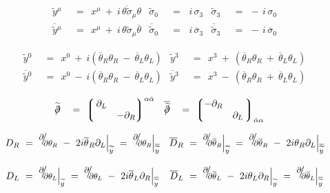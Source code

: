 \documentclass[14pt]{article}
\newcommand{\p}{\partial}
\newcommand{\wt}{\widetilde}
\newcommand{\ov}{\overline}
\newcommand{\lgr}{\left\lgroup}
\newcommand{\rgr}{\right\rgroup}
\def\slashed#1{\setbox0=\hbox{$#1$}             %
   \dimen0=\wd0                                 %
   \setbox1=\hbox{/} \dimen1=\wd1               %
   \ifdim\dimen0>\dimen1                        %
      \rlap{\hbox to \dimen0{\hfil/\hfil}}      %
      #1                                        %
   \else                                        %
      \rlap{\hbox to \dimen1{\hfil$#1$\hfil}}   %
      /                                         %
   \fi}                                         %
\begin{document}
\begin{align*}
	\wt y{}^\mu    & ~~=~~    x^\mu  ~+~  i\,\ov{\theta \wt\sigma}{}_\mu \theta
	&
	\wt \sigma{}_0    & ~~=~~\,    i\, \sigma_3
	&
	\wt \sigma{}_3    & ~~=~\,    -\, i\, \sigma_0
	\\[2mm]
	\ov{\wt y}{}^\mu    & ~~=~~    x^\mu  ~+~  i\,\theta \wt\sigma{}_\mu \ov\theta
	&
	\ov{\wt \sigma}{}_0    & ~~=~~\,    i\, \ov \sigma{}_3
	&
	\ov{\wt \sigma}{}_3    & ~~=~\,    -\, i\, \ov \sigma{}_0
\end{align*}

\begin{align*}
	\wt y{}^0    & ~~=~~  x^0  ~+~ i \left( \ov\theta{}_R\theta_R  ~-~  \ov\theta{}_L\theta_L \right)
	&
	\wt y{}^3    & ~~=~~  x^3  ~+~ \left( \ov\theta{}_R\theta_R  ~+~  \ov\theta{}_L\theta_L \right)
	\\[2mm]
	\ov{\wt y}{}^0    & ~~=~~   x^0  ~-~ i \left( \ov\theta{}_R\theta_R  ~-~  \ov\theta{}_L\theta_L \right)
	&
	\ov{\wt y}{}^3    & ~~=~~   x^3  ~-~ \left( \ov\theta{}_R\theta_R  ~+~  \ov\theta{}_L\theta_L \right)
\end{align*}

\begin{align*}
	\wt{\slashed\p} & ~~~=~ \lgr \begin{matrix}  \, \p_L  &       \\
						              & - \p_R 
				\end{matrix} \rgr^{\alpha\dot\alpha}
	&
	\ov{\slashed{\wt\p}} & ~~~=~ \lgr \begin{matrix}  - \p_R  &       \\
                                                                  & \p_L				
				     \end{matrix} \, \rgr_{\dot\alpha\alpha}
\end{align*}

\begin{align*}
	D_R    & ~=~    \deriv \p {\p \theta_R}  ~-~  2 i \ov\theta{}_R\p_L \Big|_{\wt y}
		 ~=~    \deriv \p {\p \theta_R} \Big|_{\ov{\wt y}}
	&
	\ov D{}_R    & ~=~    \deriv \p {\p \ov\theta{}_R} \Big|_{\wt y}
		       ~=~    \deriv \p {\p \ov\theta{}_R}  ~-~  2 i \theta_R \p_L \Big|_{\ov {\wt y}}
	\\[3mm]
	D_L    & ~=~    \deriv \p {\p \theta_L} \Big|_{\wt y}
		 ~=~    \deriv \p {\p \theta_L} ~-~ 2 i \ov\theta{}_L \p_R \Big|_{\ov {\wt y}}
	&
	\ov D{}_L    & ~=~    \deriv \p {\p \ov\theta{}_L} ~-~ 2 i \theta_L \p_R \Big|_{\wt y}
		       ~=~    \deriv \p {\p \ov\theta{}_L} \Big|_{\ov {\wt y}}
\end{align*}
\end{document}
